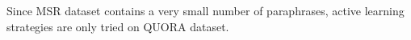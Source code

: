 \begin{itemize}
%
%

\end{itemize}

Since MSR dataset contains a very small number of paraphrases, active learning strategies are only tried on QUORA dataset.


